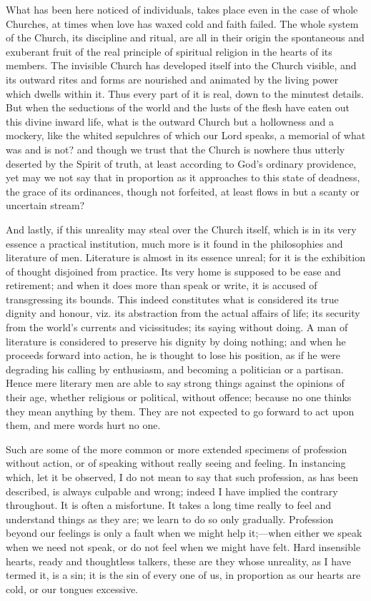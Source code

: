 What has been here noticed of individuals, takes place even in the
case of whole Churches, at times when love has waxed cold and faith
failed. The whole system of the Church, its discipline and ritual, are
all in their origin the spontaneous and exuberant fruit of the real
principle of spiritual religion in the hearts of its members. The
invisible Church has developed itself into the Church visible, and its
outward rites and forms are nourished and animated by the living power
which dwells within it. Thus every part of it is real, down to the
minutest details. But when the seductions of the world and the lusts
of the flesh have eaten out this divine inward life, what is the
outward Church but a hollowness and a mockery, like the whited
sepulchres of which our Lord speaks, a memorial of what was and is
not? and though we trust that the Church is nowhere thus utterly
deserted by the Spirit of truth, at least according to God's ordinary
providence, yet may we not say that in proportion as it approaches to
this state of deadness, the grace of its ordinances, though not
forfeited, at least flows in but a scanty or uncertain stream?

And lastly, if this unreality may steal over the Church itself,
which is in its very essence a practical institution, much more is it
found in the philosophies and literature of men. Literature is almost
in its essence unreal; for it is the exhibition of thought disjoined
from practice. Its very home is supposed to be ease and retirement;
and when it does more than speak or write, it is accused of
transgressing its bounds. This indeed constitutes what is considered
its true dignity and honour, viz. its abstraction from the actual
affairs of life; its security from the world's currents and
vicissitudes; its saying without doing. A man of literature is
considered to preserve his dignity by doing nothing; and when he
proceeds forward into action, he is thought to lose his position, as
if he were degrading his calling by enthusiasm, and becoming a
politician or a partisan. Hence mere literary men are able to say
strong things against the opinions of their age, whether religious or
political, without offence; because no one thinks they mean anything
by them. They are not expected to go forward to act upon them, and
mere words hurt no one.

Such are some of the more common or more extended specimens of
profession without action, or of speaking without really seeing and
feeling. In instancing which, let it be observed, I do not mean to say
that such profession, as has been described, is always culpable and
wrong; indeed I have implied the contrary throughout. It is often a
misfortune. It takes a long time really to feel and understand things
as they are; we learn to do so only gradually. Profession beyond our
feelings is only a fault when we might help it;—when either we speak
when we need not speak, or do not feel when we might have felt. Hard
insensible hearts, ready and thoughtless talkers, these are they whose
unreality, as I have termed it, is a sin; it is the sin of every one
of us, in proportion as our hearts are cold, or our tongues excessive.

